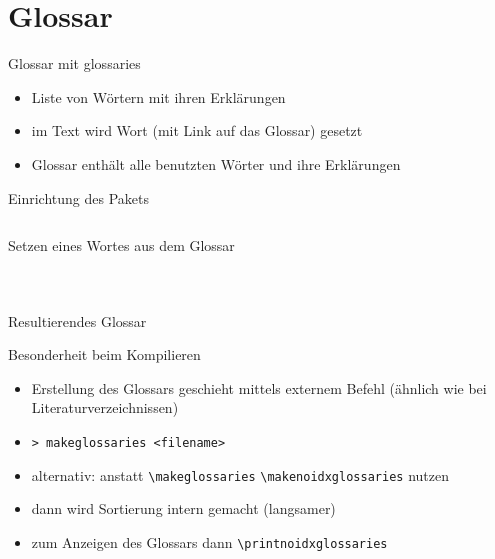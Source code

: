 \documentclass[presentation,aspectratio=169]{beamer}
\begin{document}
\section{Glossar}

\begin{frame}{Glossar mit glossaries}
  \begin{itemize}
    \item Liste von Wörtern mit ihren Erklärungen
    \item im Text wird Wort (mit Link auf das Glossar) gesetzt
    \item Glossar enthält alle benutzten Wörter und ihre Erklärungen
  \end{itemize}
\end{frame}

\begin{frame}[fragile]{Einrichtung des Pakets}
  \inputminted{latex}{codebeispiele/glossaries-setup.tex}
\end{frame}

\begin{frame}[fragile]{Setzen eines Wortes aus dem Glossar}
  \begin{columns}
    \begin{column}{.49\textwidth}
      
    \end{column}
    \begin{column}{.5\textwidth}
      \inputminted{latex}{codebeispiele/glossaries-usage.tex}
    \end{column}
  \end{columns}
\end{frame}

\begin{frame}{Resultierendes Glossar}
  \printglossary
\end{frame}

\begin{frame}[fragile]{Besonderheit beim Kompilieren}
  \begin{itemize}
    \item Erstellung des Glossars geschieht mittels externem Befehl (ähnlich wie bei Literaturverzeichnissen)
    \item \verb|> makeglossaries <filename>|
    \vspace{1em}
    \item alternativ: anstatt \verb|\makeglossaries| \verb|\makenoidxglossaries| nutzen
    \item dann wird Sortierung intern gemacht (langsamer)
    \item zum Anzeigen des Glossars dann \verb|\printnoidxglossaries|
  \end{itemize}
\end{frame}
\end{document}
